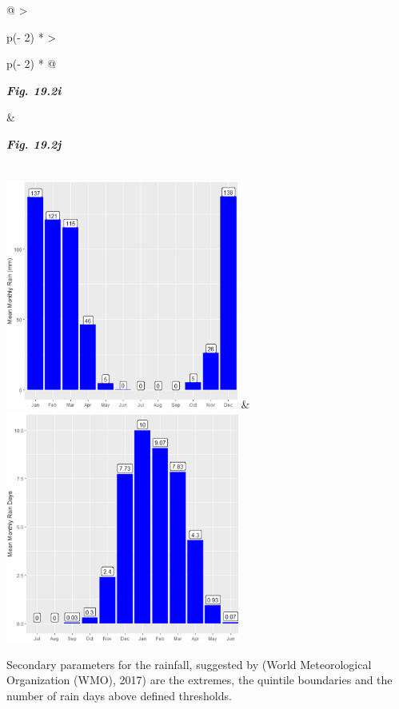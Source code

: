 \documentclass[
  letterpaper,
  DIV=11,
  numbers=noendperiod]{scrreprt}
\begin{document}
\begin{longtable}[]{@{}
  >{\raggedright\arraybackslash}p{(\columnwidth - 2\tabcolsep) * }
  >{\raggedright\arraybackslash}p{(\columnwidth - 2\tabcolsep) * }@{}}
\toprule\noalign{}
\begin{minipage}[b]{\linewidth}\raggedright
\textbf{\emph{Fig. 19.2i}}
\end{minipage} & \begin{minipage}[b]{\linewidth}\raggedright
\textbf{\emph{Fig. 19.2j}}
\end{minipage} \\
\midrule\noalign{}
\endhead
\bottomrule\noalign{}
\endlastfoot
\includegraphics[width=3.00801in,height=2.98747in]{figures/Fig19.2i.png}
&
\includegraphics[width=3.01856in,height=2.99441in]{figures/Fig19.2j.png} \\
\end{longtable}

Secondary parameters for the rainfall, suggested by (World
Meteorological Organization (WMO), 2017) are the extremes, the quintile
boundaries and the number of rain days above defined thresholds.
\end{document}
